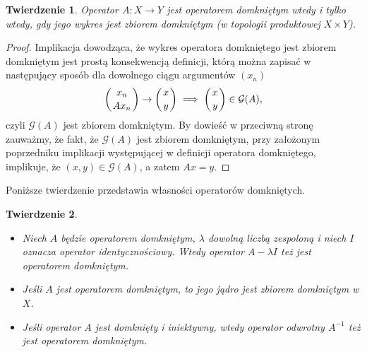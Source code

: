 \documentclass[12pt]{article}
\newtheorem{tw}{Twierdzenie}
\begin{document}
\begin{tw}
	Operator $A\colon X\to Y$ jest operatorem domkniętym wtedy i tylko wtedy, gdy jego wykres jest zbiorem domkniętym (w topologii produktowej $X\times Y$).
\end{tw}
\begin{proof}
	Implikacja dowodząca, że wykres operatora domkniętego jest zbiorem domkniętym jest prostą konsekwencją definicji, którą można zapisać w następujący sposób dla dowolnego ciągu argumentów $(x_n)$
	\begin{displaymath}
		\left({x_n} \atop {Ax_n}\right) \to \left(x \atop y\right)\implies \left(x \atop y\right) \in \mathcal{G}(A),
	\end{displaymath}
	czyli $\mathcal{G}(A)$ jest zbiorem domkniętym. By dowieść w przeciwną stronę zauważmy, że fakt, że $\mathcal{G}(A)$ jest zbiorem domkniętym, przy założonym poprzedniku implikacji występującej w definicji operatora domkniętego, implikuje, że $(x, y) \in \mathcal{G}(A)$, a zatem $Ax = y$.
\end{proof}

Poniższe twierdzenie przedstawia własności operatorów domkniętych.

\begin{tw}
	\begin{itemize}
		\item Niech $A$ będzie operatorem domkniętym, $\lambda$ dowolną liczbą zespoloną i niech $I$ oznacza operator identycznościowy. Wtedy operator $A - \lambda I $ też jest operatorem domkniętym.
		\item Jeśli $A$ jest operatorem domkniętym, to jego jądro jest zbiorem domkniętym w $X$.
		\item Jeśli operator $A$ jest domknięty i iniektywny, wtedy operator odwrotny $A^{-1}$ też jest operatorem domkniętym.
	\end{itemize}
\end{tw}
\end{document}
